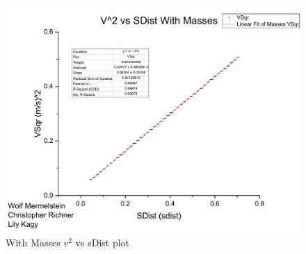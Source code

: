 \documentclass[coverpage]{article}
\begin{document}
	\begin{figure}[h] 
		\label{fig:plot-with-masses}
		\centering
		\caption{With Masses $v^2$ vs sDist plot}
		\includegraphics[width=6in]{plots/withoutMassesPlot.pdf}
	\end{figure}
	
\end{document}

